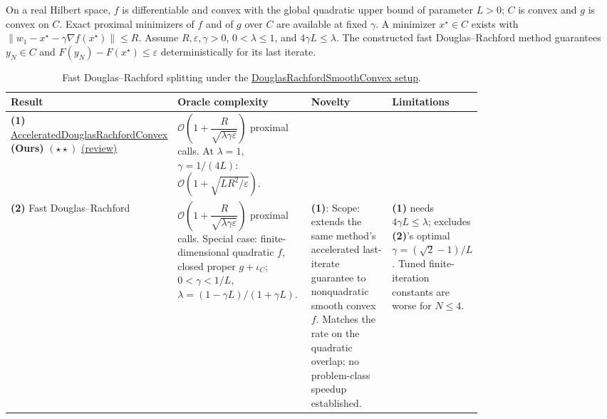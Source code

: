 \begin{table}[tp]
\centering
\caption{Fast Douglas--Rachford splitting under the \href{https://github.com/k3nfalt/longtails/blob/main/LongTails/Setups/DouglasRachfordSmoothConvex.lean}{DouglasRachfordSmoothConvex setup}.}\label{tab:DouglasRachfordSmoothConvex}
\parbox{\linewidth}{\footnotesize On a real Hilbert space, $f$ is differentiable and convex with the global quadratic upper bound of parameter $L>0$; $C$ is convex and $g$ is convex on $C$. Exact proximal minimizers of $f$ and of $g$ over $C$ are available at fixed $\gamma$. A minimizer $x^\star\in C$ exists with $\|w_1-x^\star-\gamma\nabla f(x^\star)\|\le R$. Assume $R,\varepsilon,\gamma>0$, $0<\lambda\le1$, and $4\gamma L\le\lambda$. The constructed fast Douglas--Rachford method guarantees $y_N\in C$ and $F(y_N)-F(x^\star)\le\varepsilon$ deterministically for its last iterate.}\par\smallskip
\begin{threeparttable}
\footnotesize
\setlength{\tabcolsep}{4pt}\renewcommand{\arraystretch}{1.25}
\begin{tabularx}{\linewidth}{@{}>{\raggedright\arraybackslash}p{0.20\linewidth}>{\raggedright\arraybackslash}p{0.32\linewidth}>{\raggedright\arraybackslash}p{0.25\linewidth}>{\raggedright\arraybackslash}X@{}}
\toprule
\textbf{Result} & \textbf{Oracle complexity} & \textbf{Novelty} & \textbf{Limitations} \\
\midrule
\textbf{(1)} \href{https://github.com/k3nfalt/longtails/blob/main/LongTails/Theorems/AcceleratedDouglasRachfordConvex.lean}{Accelerated\allowbreak Douglas\allowbreak Rachford\allowbreak Convex} \textbf{(Ours)} $(\star\star)$ \href{https://github.com/k3nfalt/longtails/blob/main/scripts/reviews/AcceleratedDouglasRachfordConvex.md}{(review)}
& $\mathcal{O}\!\left(1+\dfrac{R}{\sqrt{\lambda\gamma\varepsilon}}\right)$ proximal calls.
At $\lambda=1$, $\gamma=1/(4L)$: $\mathcal{O}(1+\sqrt{LR^2/\varepsilon})$.
& & \\
\midrule[1.2pt]
\textbf{(2)} Fast Douglas--Rachford \citep[Theorem~5]{patrinosStellaBemporad2014DRv2}
& $\mathcal{O}\!\left(1+\dfrac{R}{\sqrt{\lambda\gamma\varepsilon}}\right)$ proximal calls.
Special case: finite-dimensional quadratic $f$, closed proper $g+\iota_C$; $0<\gamma<1/L$, $\lambda=(1-\gamma L)/(1+\gamma L)$.
& \textbf{(1)}: Scope: extends the same method's accelerated last-iterate guarantee to nonquadratic smooth convex $f$. Matches the rate on the quadratic overlap; no problem-class speedup established.
& \textbf{(1)} needs $4\gamma L\le\lambda$; excludes \textbf{(2)}'s optimal $\gamma=(\sqrt2-1)/L$. Tuned finite-iteration constants are worse for $N\le4$.

\end{tabularx}
\end{threeparttable}
\end{table}
